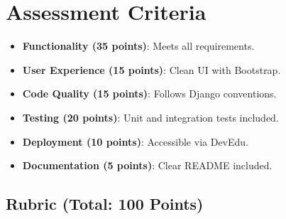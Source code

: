 \documentclass{article}
\begin{document}
\section{Assessment Criteria}
\begin{itemize}
    \item \textbf{Functionality (35 points)}: Meets all requirements.
    \item \textbf{User Experience (15 points)}: Clean UI with Bootstrap.
    \item \textbf{Code Quality (15 points)}: Follows Django conventions.
    \item \textbf{Testing (20 points)}: Unit and integration tests included.
    \item \textbf{Deployment (10 points)}: Accessible via DevEdu.
    \item \textbf{Documentation (5 points)}: Clear README included.
\end{itemize}

\subsection{Rubric (Total: 100 Points)}
\end{document}
